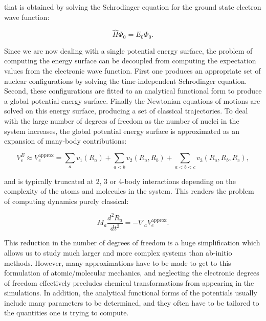 that is obtained by solving the Schrodinger equation
for the ground state electron wave function:

\begin{equation}
 \hat{H} \Phi_0 = E_0 \Phi_0 . 
\end{equation}

Since we are now dealing with a single potential
energy surface, the problem of computing the energy surface
can be decoupled from computing the
expectation values from the electronic wave function.
First one produces an appropriate set of nuclear configurations
by solving the time-independent Schrodinger equation.
Second, these configurations are fitted to an analytical
functional form to produce a global potential energy surface.
Finally the Newtonian equations of motions are solved
on this energy surface, producing a set of classical trajectories.
To deal with the large number of degrees of freedom
as the number of nuclei in the system increases,
the global potential energy surface
is approximated as an expansion of many-body contributions:

\begin{equation}
 V_e^E \approx V_e^{\text{approx}} =
    \sum_a v_1(R_a) + \sum_{a < b} v_2(R_a, R_b)
    + \sum_{a < b < c} v_3(R_a, R_b, R_c) , 
\end{equation}

and is typically truncated at 2, 3 or 4-body interactions
depending on the complexity of the atoms and molecules in the system.
This renders the problem of computing dynamics purely classical:

\begin{equation}
 M_a \frac{d^2 R_a}{dt^2} = -\nabla_a V_e^{\text{approx}} . 
\end{equation}

This reduction in the number of degrees of freedom is a huge simplification
which allows us to study much larger and more complex systems
than ab-initio methods. However, many approximations have to be made
to get to this formulation of atomic/molecular mechanics, and neglecting
the electronic degrees of freedom effectively precludes chemical
transformations from appearing in the simulations.
In addition, the analytical functional forms of the potentials
usually include many parameters to be determined,
and they often have to be tailored to the quantities
one is trying to compute.

